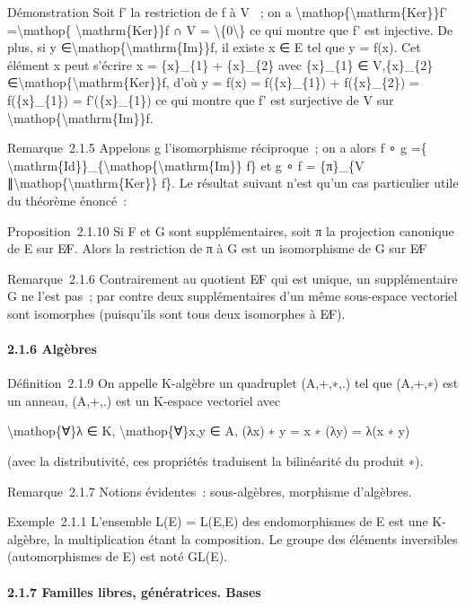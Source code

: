 \documentclass[]{article}
\begin{document}
Démonstration Soit f' la restriction de f à V ~; on a
\textbackslash{}mathop\{\textbackslash{}mathrm\{Ker\}\}f'
=\textbackslash{}mathop\{ \textbackslash{}mathrm\{Ker\}\}f ∩ V =
\textbackslash{}\{0\textbackslash{}\} ce qui montre que f' est
injective. De plus, si y
∈\textbackslash{}mathop\{\textbackslash{}mathrm\{Im\}\}f, il existe x ∈
E tel que y = f(x). Cet élément x peut s'écrire x = \{x\}\_\{1\} +
\{x\}\_\{2\} avec \{x\}\_\{1\} ∈ V,\{x\}\_\{2\}
∈\textbackslash{}mathop\{\textbackslash{}mathrm\{Ker\}\}f, d'où y = f(x)
= f(\{x\}\_\{1\}) + f(\{x\}\_\{2\}) = f(\{x\}\_\{1\}) = f'(\{x\}\_\{1\})
ce qui montre que f' est surjective de V sur
\textbackslash{}mathop\{\textbackslash{}mathrm\{Im\}\}f.

Remarque~2.1.5 Appelons g l'isomorphisme réciproque~; on a alors f ∘ g
=\{
\textbackslash{}mathrm\{Id\}\}\_\{\textbackslash{}mathop\{\textbackslash{}mathrm\{Im\}\}
f\} et g ∘ f = \{π\}\_\{V
∥\textbackslash{}mathop\{\textbackslash{}mathrm\{Ker\}\} f\}. Le
résultat suivant n'est qu'un cas particulier utile du théorème énoncé~:

Proposition~2.1.10 Si F et G sont supplémentaires, soit π la projection
canonique de E sur E∕F. Alors la restriction de π à G est un
isomorphisme de G sur E∕F

Remarque~2.1.6 Contrairement au quotient E∕F qui est unique, un
supplémentaire G ne l'est pas~; par contre deux supplémentaires d'un
même sous-espace vectoriel sont isomorphes (puisqu'ils sont tous deux
isomorphes à E∕F).

\paragraph{2.1.6 Algèbres}

Définition~2.1.9 On appelle K-algèbre un quadruplet (A,+,∗,.) tel que
(A,+,∗) est un anneau, (A,+,.) est un K-espace vectoriel avec

\textbackslash{}mathop\{∀\}λ ∈ K, \textbackslash{}mathop\{∀\}x,y ∈ A,
(λx) ∗ y = x ∗ (λy) = λ(x ∗ y)

(avec la distributivité, ces propriétés traduisent la bilinéarité du
produit ∗).

Remarque~2.1.7 Notions évidentes~: sous-algèbres, morphisme d'algèbres.

Exemple~2.1.1 L'ensemble L(E) = L(E,E) des endomorphismes de E est une
K-algèbre, la multiplication étant la composition. Le groupe des
éléments inversibles (automorphismes de E) est noté GL(E).

\paragraph{2.1.7 Familles libres, génératrices. Bases}
\end{document}
